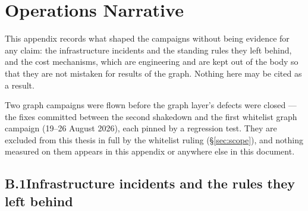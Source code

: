 \chapter{Operations Narrative}
\label{app:ops}

This appendix records what shaped the campaigns without being evidence for
any claim: the infrastructure incidents and the standing rules they left
behind, and the cost mechanisms, which are engineering and are kept out of
the body so that they are not mistaken for results of the graph. Nothing
here may be cited as a result.

Two graph campaigns were flown before the graph layer's defects were
closed --- the fixes committed between the second shakedown and the first
whitelist graph campaign (19--26 August 2026), each pinned by a regression
test. They are excluded from this thesis in full by the whitelist ruling
(\S\ref{sec:scope}), and nothing measured on them appears in this
appendix or anywhere else in this document.

\section*{B.1\quad Infrastructure incidents and the rules they left behind}

